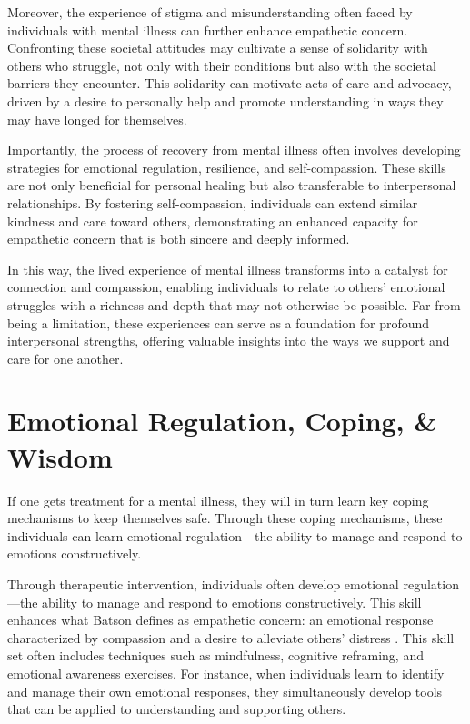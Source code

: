 \documentclass[stu]{apa7}
\begin{document}
Moreover, the experience of stigma and misunderstanding often faced by individuals with mental illness can further enhance empathetic concern. Confronting these societal attitudes may cultivate a sense of solidarity with others who struggle, not only with their conditions but also with the societal barriers they encounter. This solidarity can motivate acts of care and advocacy, driven by a desire to personally help and promote understanding in ways they may have longed for themselves.

Importantly, the process of recovery from mental illness often involves developing strategies for emotional regulation, resilience, and self-compassion. These skills are not only beneficial for personal healing but also transferable to interpersonal relationships. By fostering self-compassion, individuals can extend similar kindness and care toward others, demonstrating an enhanced capacity for empathetic concern that is both sincere and deeply informed.

In this way, the lived experience of mental illness transforms into a catalyst for connection and compassion, enabling individuals to relate to others' emotional struggles with a richness and depth that may not otherwise be possible. Far from being a limitation, these experiences can serve as a foundation for profound interpersonal strengths, offering valuable insights into the ways we support and care for one another.

\section{Emotional Regulation, Coping, \& Wisdom}

If one gets treatment for a mental illness, they will in turn learn key coping mechanisms to keep themselves safe. Through these coping mechanisms, these individuals can learn emotional regulation---the ability to manage and respond to emotions constructively.   

Through therapeutic intervention, individuals often develop emotional regulation—the ability to manage and respond to emotions constructively. This skill enhances what Batson defines as empathetic concern: an emotional response characterized by compassion and a desire to alleviate others' distress \parencite{batson_empathyaltruism_2015}. This skill set often includes techniques such as mindfulness, cognitive reframing, and emotional awareness exercises. For instance, when individuals learn to identify and manage their own emotional responses, they simultaneously develop tools that can be applied to understanding and supporting others.
\end{document}
